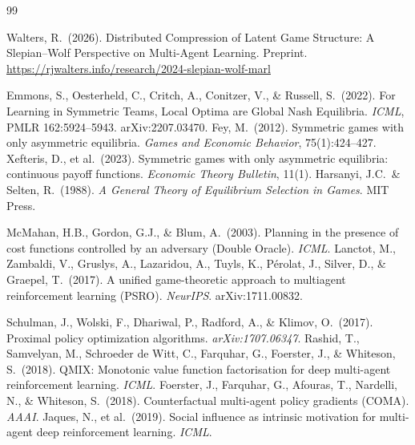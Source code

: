\documentclass{article}
\begin{document}
\begin{thebibliography}{99}

 Walters, R.\ (2026). Distributed Compression of Latent Game Structure: A Slepian--Wolf Perspective on Multi-Agent Learning. Preprint. \url{https://rjwalters.info/research/2024-slepian-wolf-marl}

 Emmons, S., Oesterheld, C., Critch, A., Conitzer, V., \& Russell, S.\ (2022). For Learning in Symmetric Teams, Local Optima are Global Nash Equilibria. \emph{ICML}, PMLR 162:5924--5943. arXiv:2207.03470.
 Fey, M.\ (2012). Symmetric games with only asymmetric equilibria. \emph{Games and Economic Behavior}, 75(1):424--427.
 Xefteris, D., et al.\ (2023). Symmetric games with only asymmetric equilibria: continuous payoff functions. \emph{Economic Theory Bulletin}, 11(1).
 Harsanyi, J.C.\ \& Selten, R.\ (1988). \emph{A General Theory of Equilibrium Selection in Games}. MIT Press.

 McMahan, H.B., Gordon, G.J., \& Blum, A.\ (2003). Planning in the presence of cost functions controlled by an adversary (Double Oracle). \emph{ICML}.
 Lanctot, M., Zambaldi, V., Gruslys, A., Lazaridou, A., Tuyls, K., P\'erolat, J., Silver, D., \& Graepel, T.\ (2017). A unified game-theoretic approach to multiagent reinforcement learning (PSRO). \emph{NeurIPS}. arXiv:1711.00832.

 Schulman, J., Wolski, F., Dhariwal, P., Radford, A., \& Klimov, O.\ (2017). Proximal policy optimization algorithms. \emph{arXiv:1707.06347}.
 Rashid, T., Samvelyan, M., Schroeder de Witt, C., Farquhar, G., Foerster, J., \& Whiteson, S.\ (2018). QMIX: Monotonic value function factorisation for deep multi-agent reinforcement learning. \emph{ICML}.
 Foerster, J., Farquhar, G., Afouras, T., Nardelli, N., \& Whiteson, S.\ (2018). Counterfactual multi-agent policy gradients (COMA). \emph{AAAI}.
 Jaques, N., et al.\ (2019). Social influence as intrinsic motivation for multi-agent deep reinforcement learning. \emph{ICML}.


\end{thebibliography}
\end{document}
